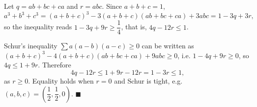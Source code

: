 Let $q=ab+bc+ca$ and $r=abc$. Since $a+b+c=1$,
\[
a^3+b^3+c^3=(a+b+c)^3-3(a+b+c)(ab+bc+ca)+3abc=1-3q+3r,
\]
so the inequality reads $1-3q+9r\ge\dfrac{1}{4}$, that is, $4q-12r\le1$.

Schur's inequality $\sum a(a-b)(a-c)\ge0$ can be written as $(a+b+c)^3-4(a+b+c)(ab+bc+ca)+9abc\ge0$, i.e. $1-4q+9r\ge0$, so $4q\le1+9r$. Therefore
\[
4q-12r\le1+9r-12r=1-3r\le1,
\]
as $r\ge0$. Equality holds when $r=0$ and Schur is tight, e.g. $(a,b,c)=\left(\dfrac{1}{2},\dfrac{1}{2},0\right)$. $\blacksquare$
